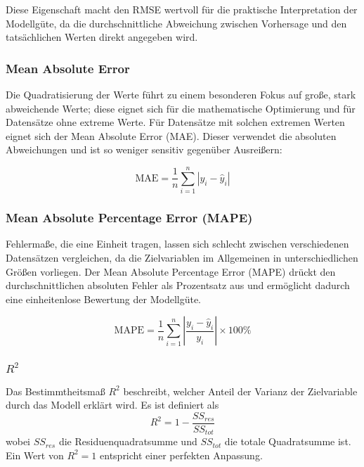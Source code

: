 Diese Eigenschaft macht den RMSE wertvoll für die praktische Interpretation der Modellgüte, da die durchschnittliche Abweichung zwischen Vorhersage und den tatsächlichen Werten direkt angegeben wird. 

\subsubsection{Mean Absolute Error}
Die Quadratisierung der Werte führt zu einem besonderen Fokus auf große, stark abweichende Werte; diese eignet sich für die mathematische Optimierung und für Datensätze ohne extreme Werte. Für Datensätze mit solchen extremen Werten eignet sich der Mean Absolute Error (MAE). Dieser verwendet die absoluten Abweichungen und ist so weniger sensitiv gegenüber Ausreißern:

\begin{equation}
  \text{MAE} = \frac{1}{n} \sum_{i=1}^{n} |y_i - \hat{y}_i|
  \label{eq:mae}
\end{equation}

\subsubsection{Mean Absolute Percentage Error (MAPE)}

Fehlermaße, die eine Einheit tragen, lassen sich schlecht zwischen verschiedenen Datensätzen vergleichen, da die Zielvariablen im Allgemeinen in unterschiedlichen Größen vorliegen. Der Mean Absolute Percentage Error (MAPE) drückt den durchschnittlichen absoluten Fehler als Prozentsatz aus und ermöglicht dadurch eine einheitenlose Bewertung der Modellgüte.

\begin{equation}
\text{MAPE} = \frac{1}{n} \sum_{i=1}^{n} \left|\frac{y_i - \hat{y}_i}{y_i}\right| \times 100\%
\label{eq:mape}
\end{equation}

\subsubsection{\(R^2\)}
Das Bestimmtheitsmaß \(R^2\) beschreibt, welcher Anteil der Varianz der Zielvariable durch das Modell erklärt wird. Es ist definiert als
\begin{equation}
  R^2 = 1 - \frac{SS_{res}}{SS_{tot}}
\end{equation}
wobei \(SS_{res}\) die Residuenquadratsumme und \(SS_{tot}\) die totale Quadratsumme ist. Ein Wert von \(R^2 = 1\) entspricht einer perfekten Anpassung.

